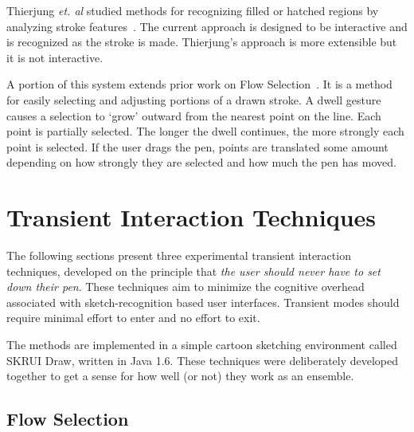 \documentclass{egpubl}
\begin{document}
Thierjung \textit{et. al} studied methods for recognizing filled or
hatched regions by analyzing stroke
features~\cite{thierjung-hatching}. The current approach is designed
to be interactive and is recognized as the stroke is made. Thierjung's
approach is more extensible but it is not interactive.

A portion of this system extends prior work on Flow
Selection~\cite{johnson-flow-selection}. It is a method for easily
selecting and adjusting portions of a drawn stroke. A dwell gesture
causes a selection to `grow' outward from the nearest point on the
line. Each point is partially selected. The longer the dwell
continues, the more strongly each point is selected. If the user drags
the pen, points are translated some amount depending on how strongly
they are selected and how much the pen has moved.

\section{Transient Interaction Techniques}

The following sections present three experimental transient
interaction techniques, developed on the principle that \emph{the user
  should never have to set down their pen}. These techniques aim to
minimize the cognitive overhead associated with sketch-recognition
based user interfaces. Transient modes should require minimal effort
to enter and no effort to exit.

The methods are implemented in a simple cartoon sketching environment
called SKRUI Draw, written in Java 1.6. These techniques were
deliberately developed together to get a sense for how well (or not)
they work as an ensemble.

\subsection{Flow Selection}
\end{document}
